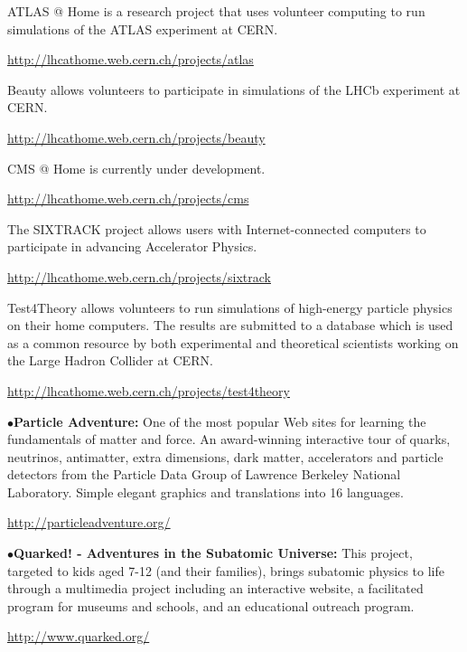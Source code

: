 \smallskip

\item{}ATLAS @ Home is a research project that uses volunteer computing to run simulations of the ATLAS experiment at CERN.
	\item{}\qquad\url{http://lhcathome.web.cern.ch/projects/atlas}

\smallskip

\item{}Beauty allows volunteers to participate in simulations of the LHCb experiment at CERN.
	\item{}\qquad\url{http://lhcathome.web.cern.ch/projects/beauty}

\smallskip

\item{}CMS @ Home is currently under development.
	\item{}\qquad\url{http://lhcathome.web.cern.ch/projects/cms}

\smallskip

\item{}The SIXTRACK project allows users with Internet-connected computers to participate in advancing Accelerator Physics.
	\item{}\qquad\url{http://lhcathome.web.cern.ch/projects/sixtrack}

\smallskip

\item{}Test4Theory allows volunteers to run simulations of high-energy particle physics on their home computers. The results are submitted to a database which is used as a common resource by both experimental and theoretical scientists working on the Large Hadron Collider at CERN.
	\item{}\qquad\url{http://lhcathome.web.cern.ch/projects/test4theory}

\smallskip

\item{$\bullet$}{\bf Particle Adventure:} 
One of the most popular Web sites for learning the fundamentals of matter and force. An award-winning interactive tour of quarks, neutrinos, antimatter, extra dimensions, dark matter, accelerators and particle detectors from the Particle Data Group of Lawrence Berkeley National Laboratory. Simple elegant graphics and translations into 16 languages.
	\item{}\qquad\url{http://particleadventure.org/}

\smallskip

\item{$\bullet$}{\bf Quarked! - Adventures in the Subatomic Universe:}
This project, targeted to kids aged 7-12 (and their families), brings subatomic physics to life through a multimedia project including an interactive website, a facilitated program for museums and schools, and an educational outreach program.
	\item{}\qquad\url{http://www.quarked.org/}

